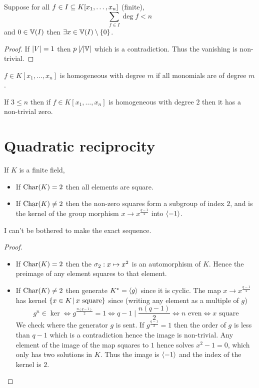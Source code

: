 \begin{cor}
    Suppose for all $f \in I \subseteq K[x_1, \dots , x_n]$ (finite), 
    \[\sum_{f \in I} \deg f < n\]
    and $0 \in \mathbb{V}(I)$ then $\exists x \in \mathbb{V}(I) \setminus \left\{0\right\}$.
\end{cor}
\begin{proof}
    If $\left\vert V \right\vert = 1$ then $p \not \mid \left\vert \mathbb{V} \right\vert$ which is a contradiction.
    Thus the vanishing is non-trivial.
\end{proof}

\begin{dfn}[Homogeneous]
    $f \in K[x_1, \dots , x_n]$ is homogeneous with degree $m$ 
    if all monomials are of degree $m$.
\end{dfn}

\begin{cor}
    If $3 \le n$ then if $f \in K[x_1, \dots , x_n]$ 
    is homogeneous with degree $2$ then it has a non-trivial zero.
\end{cor}

\section{Quadratic reciprocity}
\begin{prop}
    If $K$ is a finite field,
    \begin{itemize}
        \item If $\mathrm{Char}(K) = 2$ then all elements are square.
        \item If $\mathrm{Char}(K) \ne 2$ 
        then the non-zero squares form a subgroup of index $2$,
        and is the kernel of the group morphism 
        $x \to x^{\frac{q-1}{2}}$ into $\langle-1\rangle$.
    \end{itemize}
    I can't be bothered to make the exact sequence.%
\end{prop}
\begin{proof}~
    \begin{itemize}
        \item If $\mathrm{Char}(K) = 2$ then the 
         $\sigma_2 : x \mapsto x^2$
        is an automorphism of $K$. 
        Hence the preimage of any element squares to that element.
        \item If $\mathrm{Char}(K) \ne 2$ then generate $K^* = \langle g\rangle$ 
        since it is cyclic.
        The map $x \to x^{\frac{q-1}{2}}$ 
        has kernel $\left\{x \in K \,|\, x \text{ square}\right\}$ since
        (writing any element as a multiple of $g$)
        \[
            g^n \in \ker \iff g^\frac{n(q-1)}{2} = 1 \iff 
            q - 1 \mid \frac{n(q - 1)}{2} \iff n \text{ even} 
            \iff x \text{ square}
        \]
        We check where the generator $g$ is sent. 
        If $g^{\frac{q - 1}{2}} = 1$ then the order of $g$ 
        is less than $q - 1$ which is a contradiction
        hence the image is non-trivial.
        Any element of the image of the map squares to $1$
        hence solves $x^2 - 1 = 0$,
        which only has two solutions in $K$.
        Thus the image is $\langle-1\rangle$ and the index of the kernel is $2$.
    \end{itemize}
\end{proof}

